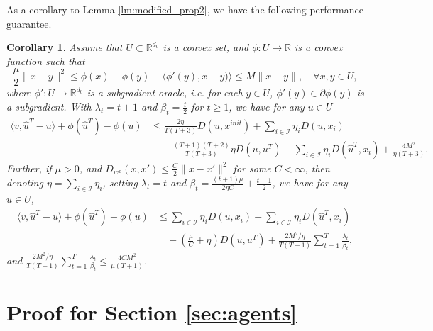 \documentclass[10pt]{article}
\newcommand{\mc}{\mathcal}
\newcommand{\R}{\mathbb{R}}
\newtheorem{corollary}{Corollary}[section]
\begin{document}
As a corollary to Lemma \ref{lm:modified_prop2}, we have the following performance guarantee.
\begin{corollary}\label{cor:lambda_beta}
Assume that $U\subset \R^{d_0}$ is a convex set, and $\phi:U\to \R$ is a convex function such that 
\begin{displaymath}
    \frac{\mu}{2}\|x-y\|^2\leq \phi(x) - \phi(y)-\langle \phi'(y),x-y)\rangle\leq M\|x-y\|,\quad\forall x,y\in U,
\end{displaymath}
where $\phi':U\to \R^{d_0}$ is a subgradient oracle, i.e. for each $y\in U$, $\phi'(y)\in \partial \phi(y)$ is a subgradient. With $\lambda_t = t+1$ and $\beta_t =\frac{t}{2}$ for $t\geq 1$, we have for any $u\in U$
\begin{align*}
     \langle v,\widehat{u}^T-u\rangle + \phi(\widehat{u}^T) - \phi(u) &\leq  \frac{2\eta}{T(T+3)}D(u,x^{init})  + \sum_{i\in \mc I} \eta_i D({u},x_i)\\
     & \quad- \frac{(T+1)(T+2)}{T(T+3)}\eta D(u,u^T) -\sum_{i\in \mc I} \eta_i D(\widehat{u}^T,x_i)+ \frac{4M^2}{\eta(T+3)}.
\end{align*}
Further, if $\mu >0$, and $D_{w^{x}}(x,x')\leq \frac{C}{2}\|x-x'\|^2$ for some $C<\infty$, then denoting $\eta = \sum_{i\in \mc I}\eta_i$, setting $\lambda_t = t$ and $\beta_t = \frac{(t+1)\mu}{2\eta C} +\frac{t-1}{2}$, we have for any $u\in U$,
\begin{align*}
    \langle v,\widehat{u}^T-u\rangle + \phi(\widehat{u}^T) - \phi(u)  &\leq  \sum_{i\in \mc I} \eta_i D({u},x_i) - \sum_{i\in \mc I} \eta_i D(\widehat{u}^T,x_i) \\
    &\quad - (\frac{\mu}{ C} +\eta)D(u,u^T) + \frac{2M^2/\eta}{T(T+1)}\sum_{t=1}^T \frac{\lambda_t}{\beta_t},
\end{align*}
and $\frac{2M^2/\eta}{T(T+1)}\sum_{t=1}^T \frac{\lambda_t}{\beta_t} \leq \frac{4CM^2}{\mu (T+1)}$. 
\end{corollary}

\section{Proof for Section \ref{sec:agents}}\label{sec:proof_setup}
\end{document}
